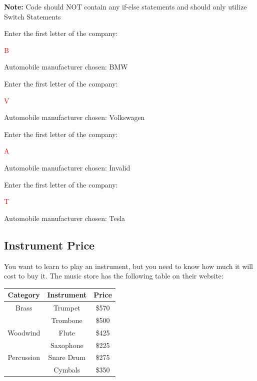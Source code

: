 \textbf{Note:} Code should NOT contain any  if-else statements and should only utilize Switch Statements


\begin{sample}
Enter the first letter of the company:

 \textcolor{red}{B}
 
Automobile manufacturer chosen: BMW


\end{sample}

\begin{sample}
Enter the first letter of the company:

 \textcolor{red}{V}
 
Automobile manufacturer chosen: Volkswagen


\end{sample}

\begin{sample}
Enter the first letter of the company:

 \textcolor{red}{A}
 
Automobile manufacturer chosen: Invalid

\end{sample}
\begin{sample}
Enter the first letter of the company:

 \textcolor{red}{T}
 
Automobile manufacturer chosen: Tesla

\end{sample}

\subsection{Instrument Price}

You want to learn to play an instrument, but you need to know how much it will cost to buy it. The music store has the following table on their website:


\begin{table}[H]
    \centering
       \begin{tabular}{|c|c|c|}
    \hline
    \textbf{Category} & \textbf{Instrument} & \textbf{Price} \\
    \hline
    Brass & Trumpet & \$570 \\
                           & Trombone & \$500 \\
    \hline
    Woodwind & Flute & \$425 \\
                              & Saxophone & \$225 \\
    \hline
    Percussion & Snare Drum & \$275 \\
                                & Cymbals & \$350 \\
    \hline
    \end{tabular}

\end{table}


